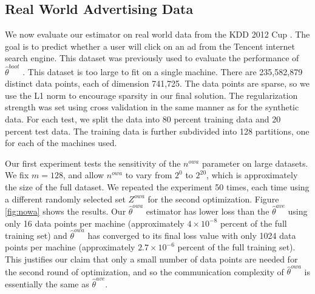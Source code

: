 \documentclass[twoside]{article}
\newcommand{\Zowa}{Z^{\textit{owa}}}
\newcommand{\nowa}{n^{\textit{owa}}}
\newcommand{\w}{\theta}
\newcommand{\wowa}{\hat\w^{owa}}
\newcommand{\wave}{\hat\w^{ave}}
\newcommand{\wboot}{\hat\w^{boot}}
\begin{document}
\subsection{Real World Advertising Data}

\vspace{-0.1in}
We now evaluate our estimator on real world data from the KDD 2012 Cup \citep{kddcup2012}.
The goal is to predict whether a user will click on an ad from the Tencent internet search engine.
This dataset was previously used to evaluate the performance of $\wboot$ \citep{zhang2012communication}.
This dataset is too large to fit on a single machine.
There are 235,582,879 distinct data points,
each of dimension 741,725.
The data points are sparse, so we use the L1 norm to encourage sparsity in our final solution.
The regularization strength was set using cross validation in the same manner as for the synthetic data.
For each test, we split the data into 80 percent training data and 20 percent test data.
The training data is further subdivided into 128 partitions,
one for each of the machines used.

Our first experiment tests the sensitivity of the $\nowa$ parameter on large datasets.
We fix $m=128$, and allow $\nowa$ to vary from $2^0$ to $2^{20}$,
which is approximately the size of the full dataset.
We repeated the experiment 50 times, each time using a different randomly selected set $\Zowa$ for the second optimization.
Figure \ref{fig:nowa} shows the results.
Our $\wowa$ estimator has lower loss than the $\wave$ using only 16 data points per machine (approximately $4\times10^{-8}$ percent of the full training set)
and $\wowa$ has converged to its final loss value with only 1024 data points per machine (approximately $2.7\times10^{-6}$ percent of the full training set).
This justifies our claim that only a small number of data points are needed for the second round of optimization,
and so the communication complexity of $\wowa$ is essentially the same as $\wave$.
\end{document}

